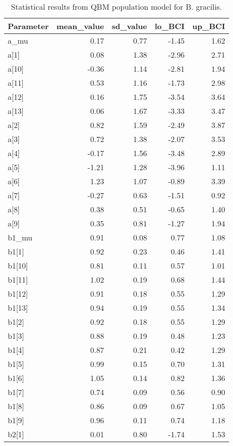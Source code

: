 \documentclass[12pt,]{article}
\begin{document}
\begin{table}[ht]
\centering
\caption{Statistical results from QBM population model for B. gracilis.} 
{\footnotesize
\begin{tabular}{lrrrr}
  \hline
Parameter & mean\_value & sd\_value & lo\_BCI & up\_BCI \\ 
  \hline
a\_mu & 0.17 & 0.77 & -1.45 & 1.62 \\ 
  a[1] & 0.08 & 1.38 & -2.96 & 2.71 \\ 
  a[10] & -0.36 & 1.14 & -2.81 & 1.94 \\ 
  a[11] & 0.53 & 1.16 & -1.73 & 2.98 \\ 
  a[12] & 0.16 & 1.75 & -3.54 & 3.64 \\ 
  a[13] & 0.06 & 1.67 & -3.33 & 3.47 \\ 
  a[2] & 0.82 & 1.59 & -2.49 & 3.87 \\ 
  a[3] & 0.72 & 1.38 & -2.07 & 3.53 \\ 
  a[4] & -0.17 & 1.56 & -3.48 & 2.89 \\ 
  a[5] & -1.21 & 1.28 & -3.96 & 1.11 \\ 
  a[6] & 1.23 & 1.07 & -0.89 & 3.39 \\ 
  a[7] & -0.27 & 0.63 & -1.51 & 0.92 \\ 
  a[8] & 0.38 & 0.51 & -0.65 & 1.40 \\ 
  a[9] & 0.35 & 0.81 & -1.27 & 1.94 \\ 
  b1\_mu & 0.91 & 0.08 & 0.77 & 1.08 \\ 
  b1[1] & 0.92 & 0.23 & 0.46 & 1.41 \\ 
  b1[10] & 0.81 & 0.11 & 0.57 & 1.01 \\ 
  b1[11] & 1.02 & 0.19 & 0.68 & 1.44 \\ 
  b1[12] & 0.91 & 0.18 & 0.55 & 1.29 \\ 
  b1[13] & 0.94 & 0.19 & 0.55 & 1.34 \\ 
  b1[2] & 0.92 & 0.18 & 0.55 & 1.29 \\ 
  b1[3] & 0.88 & 0.19 & 0.48 & 1.23 \\ 
  b1[4] & 0.87 & 0.21 & 0.42 & 1.29 \\ 
  b1[5] & 0.99 & 0.15 & 0.70 & 1.31 \\ 
  b1[6] & 1.05 & 0.14 & 0.82 & 1.36 \\ 
  b1[7] & 0.74 & 0.09 & 0.56 & 0.90 \\ 
  b1[8] & 0.86 & 0.09 & 0.67 & 1.05 \\ 
  b1[9] & 0.96 & 0.11 & 0.74 & 1.18 \\ 
  b2[1] & 0.01 & 0.80 & -1.74 & 1.53 \\ 

\end{tabular}}
\end{table}
\end{document}
